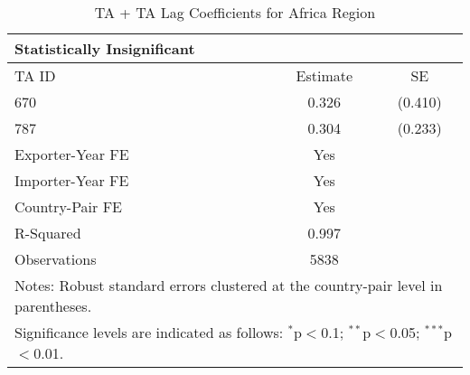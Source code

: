 \begin{table}[htbp]
    \centering
    \caption{TA + TA Lag Coefficients for Africa Region}
    \label{tab:pta_africa}
    \begin{adjustbox}{max width=\textwidth}
    \begin{tabular}{lcc}
    \hline
    \textbf{Statistically Insignificant} &  &  \\
    \hline
    TA ID & Estimate & SE \\
    \hline
    670 & 0.326 & (0.410) \\
    787 & 0.304 & (0.233) \\
    \hline
    Exporter-Year FE & Yes \\
    Importer-Year FE & Yes \\
    Country-Pair FE & Yes \\
    R-Squared & 0.997 \\
    Observations & 5838 \\
    \hline
    \multicolumn{3}{l}{\footnotesize{Notes: Robust standard errors clustered at the country-pair level in parentheses.}} \\
    \multicolumn{3}{l}{\footnotesize{Significance levels are indicated as follows: $^{\ast}$p$<$0.1; $^{\ast\ast}$p$<$0.05; $^{\ast\ast\ast}$p$<$0.01.}} \\
    \end{tabular}
    \end{adjustbox}
\end{table}
